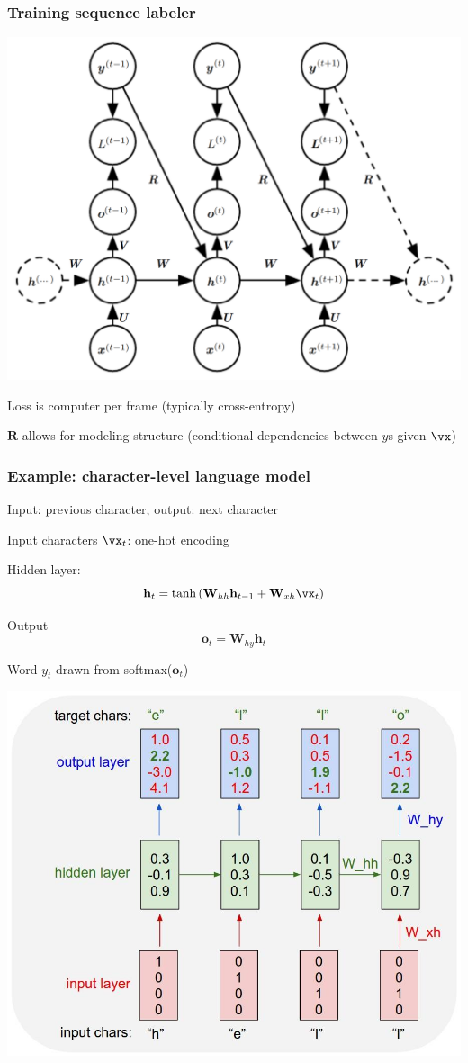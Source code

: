 \documentclass[xcolor=dvipsnames]{beamer}
\begin{document}
\begin{frame}
  \frametitle{Training sequence labeler}
  \includegraphics[width=.6\textwidth]{gcb-rnn-seq2seq-fixedlen}\raisebox{1em}{[Goodfellow
  et al.]}
\bi
\item Loss is computer per frame (typically cross-entropy)
\item $\mathbf{R}$ allows for modeling structure (conditional
  dependencies between $y$s given $\vx$)
\ei
\end{frame}

\begin{frame}
  \frametitle{Example: character-level language model}
  \bi
\item Input: previous character, output: next character
\item Input characters $\vx_t$: one-hot encoding
\ei
\begin{minipage}[c]{.5\linewidth}
  \bi
\item Hidden layer:
\[\mathbf{h}_t=\tanh\left(\mathbf{W}_{hh}\mathbf{h}_{t-1}+\mathbf{W}_{xh}\vx_t\right)
\]
\item Output
\[\mathbf{o}_t=\mathbf{W}_{hy}\mathbf{h}_t
\]
\item Word $y_t$ drawn from softmax($\mathbf{o}_t$)
\ei
\end{minipage}%
\begin{minipage}[c]{.5\linewidth}
\includegraphics[width=.99\textwidth]{ak-char-rnn}  
\end{minipage}

\end{frame}
\end{document}
